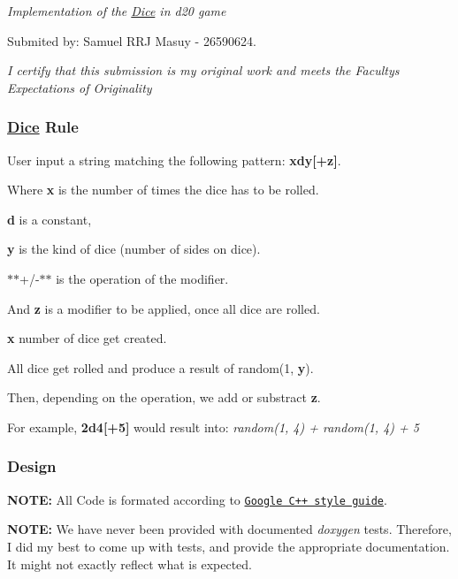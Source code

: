 {\itshape Implementation of the \hyperlink{class_dice}{Dice} in d20 game}

Submited by\+: Samuel R\+RJ Masuy -\/ 26590624.

{\itshape I certify that this submission is my original work and meets the Faculty\textquotesingle{}s Expectations of Originality}

\subsubsection*{\hyperlink{class_dice}{Dice} Rule}


\begin{DoxyEnumerate}
\item User input a string matching the following pattern\+: {\bfseries xdy\mbox{[}+z\mbox{]}}.
\begin{DoxyItemize}
\item Where {\bfseries x} is the number of times the dice has to be rolled.
\item {\bfseries d} is a constant,
\item {\bfseries y} is the kind of dice (number of sides on dice).
\item $\ast$$\ast$+/-\/$\ast$$\ast$ is the operation of the modifier.
\item And {\bfseries z} is a modifier to be applied, once all dice are rolled.
\end{DoxyItemize}
\item {\bfseries x} number of dice get created.
\item All dice get rolled and produce a result of random(1, {\bfseries y}).
\item Then, depending on the operation, we add or substract {\bfseries z}.
\end{DoxyEnumerate}

For example, {\bfseries 2d4\mbox{[}+5\mbox{]}} would result into\+: {\itshape random(1, 4) + random(1, 4) + 5}

\subsubsection*{Design}


\begin{DoxyItemize}
\item {\bfseries N\+O\+TE\+:} All Code is formated according to \href{https://google.github.io/styleguide/cppguide.html}{\tt Google C++ style guide}.
\item {\bfseries N\+O\+TE\+:} We have never been provided with documented {\itshape doxygen} tests. Therefore, I did my best to come up with tests, and provide the appropriate documentation. It might not exactly reflect what is expected.
\end{DoxyItemize}


